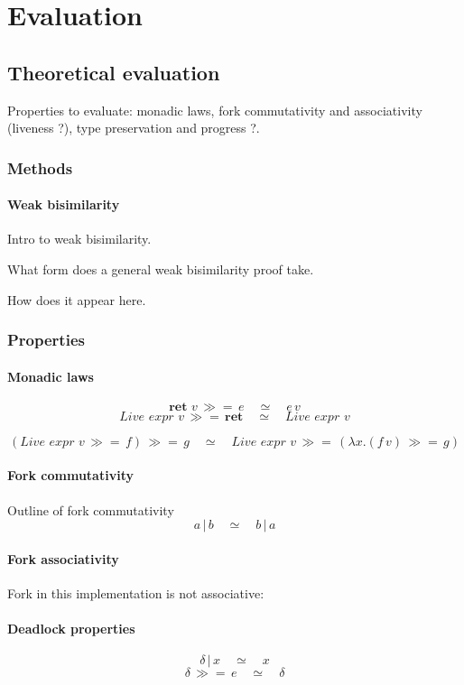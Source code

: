 \documentclass[12pt,twoside,notitlepage]{report}
\begin{document}
\cleardoublepage
\chapter{Evaluation}

\section{Theoretical evaluation}
Properties to evaluate: monadic laws, fork commutativity and associativity (liveness ?), type preservation and progress ?.

\subsection{Methods}

\subsubsection{Weak bisimilarity}
Intro to weak bisimilarity.


What form does a general weak bisimilarity proof take.


How does it appear here.
\subsection{Properties}
\subsubsection{Monadic laws}

\[ \textbf{ret } v\,\gg=\, e\quad \simeq \quad e\,v \]
\[  \textit{Live expr }v\,\gg=\, \textbf{ret}\quad \simeq \quad \textit{Live expr }v \]

\[ (\textit{Live expr }v\, \gg=\, f) \, \gg=\, g \quad \simeq \quad \textit{Live expr }v\, \gg=\, (\lambda x. (f\, v) \, \gg=\, g ) \]

\subsubsection{Fork commutativity}
Outline of fork commutativity
\[ a\,|\,b\quad\simeq\quad b \, | \, a \]
\subsubsection{Fork associativity}
Fork in this implementation is not associative:
\subsubsection{Deadlock properties}
\[ \delta \, |\, x \quad \simeq \quad x \]
\[ \delta \, \gg=\, e\quad \simeq \quad \delta \]
\end{document}

